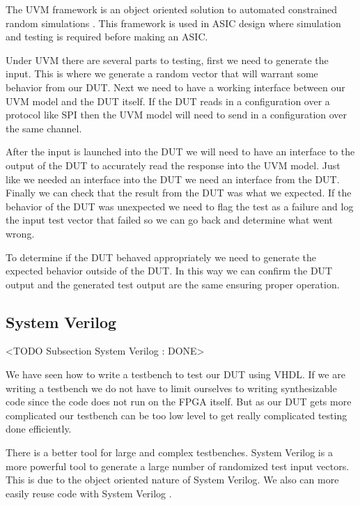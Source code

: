 The \ac{UVM} framework is an object oriented solution to automated constrained random simulations \cite{uvmref}. This framework is used in \ac{ASIC} design where simulation and testing is required before making an \ac{ASIC}.

Under \ac{UVM} there are several parts to testing, first we need to generate the input. This is where we generate a random vector that will warrant some behavior from our \ac{DUT}. Next we need to have a working interface between our \ac{UVM} model and the \ac{DUT} itself. If the \ac{DUT} reads in a configuration over a protocol like \ac{SPI} then the \ac{UVM} model will need to send in a configuration over the same channel. 

After the input is launched into the \ac{DUT} we will need to have an interface to the output of the \ac{DUT} to accurately read the response into the \ac{UVM} model. Just like we needed an interface into the \ac{DUT} we need an interface from the \ac{DUT}. Finally we can check that the result from the \ac{DUT} was what we expected. If the behavior of the \ac{DUT} was unexpected we need to flag the test as a failure and log the input test vector that failed so we can go back and determine what went wrong. 

To determine if the \ac{DUT} behaved appropriately we need to generate the expected behavior outside of the \ac{DUT}. In this way we can confirm the \ac{DUT} output and the generated test output are the same ensuring proper operation.  
	
\subsection{System Verilog}
	<TODO Subsection System Verilog : DONE>

We have seen how to write a testbench to test our \ac{DUT} using \ac{VHDL}. If we are writing a testbench we do not have to limit ourselves to writing synthesizable code since the code does not run on the \ac{FPGA} itself. But as our \ac{DUT} gets more complicated our testbench can be too low level to get really complicated testing done efficiently. 

There is a better tool for large and complex testbenches. System Verilog is a more powerful tool to generate a large number of randomized test input vectors. This is due to the object oriented nature of System Verilog. We also can more easily reuse code with System Verilog \cite{sysvref}. 
